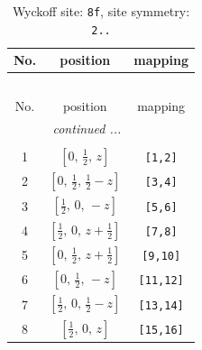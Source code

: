 \documentclass[fleqn,8pt]{jsarticle}
\begin{document}
\begin{longtable}{ccc}
\caption{Wyckoff site: {\tt 8f}, site symmetry: {\tt 2..}}
 \\
 \hline \hline
No. & position & mapping \\ \hline \endfirsthead

\multicolumn{2}{l}{\tablename\ \thetable{}} \\
 \hline \hline
No. & position & mapping \\ \hline \endhead

 \hline \hline
\multicolumn{2}{r}{\footnotesize\it continued ...} \\ \endfoot

 \hline \hline
\multicolumn{2}{r}{} \\ \endlastfoot

1 & $\left[ 0,\, \frac{1}{2},\, z \right]$ & {\tt [1,2]} \\ \hline
2 & $\left[ 0,\, \frac{1}{2},\, \frac{1}{2} - z \right]$ & {\tt [3,4]} \\ \hline
3 & $\left[ \frac{1}{2},\, 0,\, - z \right]$ & {\tt [5,6]} \\ \hline
4 & $\left[ \frac{1}{2},\, 0,\, z + \frac{1}{2} \right]$ & {\tt [7,8]} \\ \hline
5 & $\left[ 0,\, \frac{1}{2},\, z + \frac{1}{2} \right]$ & {\tt [9,10]} \\ \hline
6 & $\left[ 0,\, \frac{1}{2},\, - z \right]$ & {\tt [11,12]} \\ \hline
7 & $\left[ \frac{1}{2},\, 0,\, \frac{1}{2} - z \right]$ & {\tt [13,14]} \\ \hline
8 & $\left[ \frac{1}{2},\, 0,\, z \right]$ & {\tt [15,16]} \\
\end{longtable}
\renewcommand{\arraystretch}{1.2}
\end{document}
